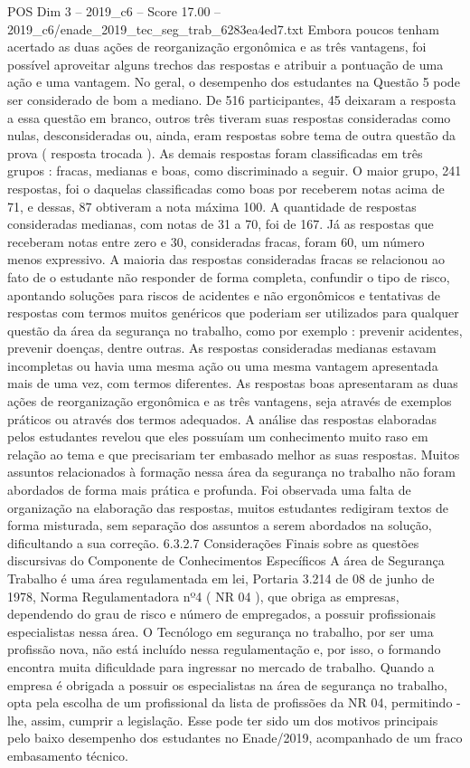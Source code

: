 \begin{textsample}{POS Dim 3 – 2019\_c6 – Score 17.00 – 2019\_c6/enade\_2019\_tec\_seg\_trab\_6283ea4ed7.txt}
Embora poucos tenham acertado as duas ações de reorganização ergonômica e as três vantagens, foi possível aproveitar alguns trechos das respostas e atribuir a pontuação de uma ação e uma vantagem.
No geral, o desempenho dos estudantes na Questão 5 pode ser considerado de bom a mediano.
De 516 participantes, 45 deixaram a resposta a essa questão em branco, outros três tiveram suas respostas consideradas como nulas, desconsideradas ou, ainda, eram respostas sobre tema de outra questão da prova ( resposta trocada ).
As demais respostas foram classificadas em três grupos : fracas, medianas e boas, como discriminado a seguir.
O maior grupo, 241 respostas, foi o daquelas classificadas como boas por receberem notas acima de 71, e dessas, 87 obtiveram a nota máxima 100.
A quantidade de respostas consideradas medianas, com notas de 31 a 70, foi de 167.
Já as respostas que receberam notas entre zero e 30, consideradas fracas, foram 60, um número menos expressivo.
A maioria das respostas consideradas fracas se relacionou ao fato de o estudante não responder de forma completa, confundir o tipo de risco, apontando soluções para riscos de acidentes e não ergonômicos e tentativas de respostas com termos muitos genéricos que poderiam ser utilizados para qualquer questão da área da segurança no trabalho, como por exemplo : prevenir acidentes, prevenir doenças, dentre outras.
As respostas consideradas medianas estavam incompletas ou havia uma mesma ação ou uma mesma vantagem apresentada mais de uma vez, com termos diferentes.
As respostas boas apresentaram as duas ações de reorganização ergonômica e as três vantagens, seja através de exemplos práticos ou através dos termos adequados.
A análise das respostas elaboradas pelos estudantes revelou que eles possuíam um conhecimento muito raso em relação ao tema e que precisariam ter embasado melhor as suas respostas.
Muitos assuntos relacionados à formação nessa área da segurança no trabalho não foram abordados de forma mais prática e profunda.
Foi observada uma falta de organização na elaboração das respostas, muitos estudantes redigiram textos de forma misturada, sem separação dos assuntos a serem abordados na solução, dificultando a sua correção. 6.3.2.7 Considerações Finais sobre as questões discursivas do Componente de Conhecimentos Específicos A área de Segurança Trabalho é uma área regulamentada em lei, Portaria 3.214 de 08 de junho de 1978, Norma Regulamentadora nº4 ( NR 04 ), que obriga as empresas, dependendo do grau de risco e número de empregados, a possuir profissionais especialistas nessa área.
O Tecnólogo em segurança no trabalho, por ser uma profissão nova, não está incluído nessa regulamentação e, por isso, o formando encontra muita dificuldade para ingressar no mercado de trabalho.
Quando a empresa é obrigada a possuir os especialistas na área de segurança no trabalho, opta pela escolha de um profissional da lista de profissões da NR 04, permitindo -lhe, assim, cumprir a legislação.
Esse pode ter sido um dos motivos principais pelo baixo desempenho dos estudantes no Enade/2019, acompanhado de um fraco embasamento técnico.


\end{textsample}
